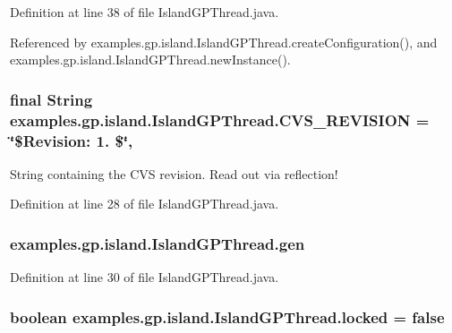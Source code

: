 Definition at line 38 of file Island\-G\-P\-Thread.\-java.



Referenced by examples.\-gp.\-island.\-Island\-G\-P\-Thread.\-create\-Configuration(), and examples.\-gp.\-island.\-Island\-G\-P\-Thread.\-new\-Instance().

\hypertarget{classexamples_1_1gp_1_1island_1_1_island_g_p_thread_a46c58c99514f626ddc3f6ee81baa8bbb}{
\subsubsection[{C\-V\-S\-\_\-\-R\-E\-V\-I\-S\-I\-O\-N}]{\setlength{\rightskip}{0pt plus 5cm}final String examples.\-gp.\-island.\-Island\-G\-P\-Thread.\-C\-V\-S\-\_\-\-R\-E\-V\-I\-S\-I\-O\-N = \char`\"{}\$Revision\-: 1. \$\char`\"{}\hspace{0.3cm}{\ttfamily [static]}, {\ttfamily [private]}}}\label{classexamples_1_1gp_1_1island_1_1_island_g_p_thread_a46c58c99514f626ddc3f6ee81baa8bbb}
String containing the C\-V\-S revision. Read out via reflection! 

Definition at line 28 of file Island\-G\-P\-Thread.\-java.

\hypertarget{classexamples_1_1gp_1_1island_1_1_island_g_p_thread_a74c645600933327ec755b13f54c6dc92}{
\subsubsection[{gen}]{ examples.\-gp.\-island.\-Island\-G\-P\-Thread.\-gen\hspace{0.3cm}{\ttfamily [private]}}}\label{classexamples_1_1gp_1_1island_1_1_island_g_p_thread_a74c645600933327ec755b13f54c6dc92}


Definition at line 30 of file Island\-G\-P\-Thread.\-java.

\hypertarget{classexamples_1_1gp_1_1island_1_1_island_g_p_thread_a2a0e5fd08670cc094e538789f6e8b74f}{
\subsubsection[{locked}]{\setlength{\rightskip}{0pt plus 5cm}boolean examples.\-gp.\-island.\-Island\-G\-P\-Thread.\-locked = false\hspace{0.3cm}{\ttfamily [static]}}}\label{classexamples_1_1gp_1_1island_1_1_island_g_p_thread_a2a0e5fd08670cc094e538789f6e8b74f}


